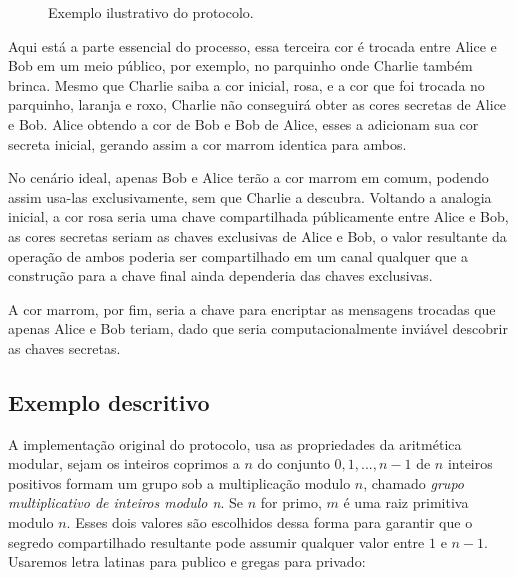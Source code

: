 \documentclass{article}
\begin{document}
\begin{figure}[htpb]
    \centering
    
    \caption{Exemplo ilustrativo do protocolo.}%
    \label{fig:diagram}
\end{figure}

Aqui está a parte essencial do processo, essa terceira cor é trocada entre
Alice e Bob em um meio público, por exemplo, no parquinho onde Charlie também
brinca. Mesmo que Charlie saiba a cor inicial, rosa, e a cor que foi trocada no
parquinho, laranja e roxo, Charlie não conseguirá obter as cores secretas de
Alice e Bob. Alice obtendo a cor de Bob e Bob de Alice, esses a adicionam sua
cor secreta inicial, gerando assim a cor marrom identica para ambos.

No cenário ideal, apenas Bob e Alice terão a cor marrom em comum, podendo assim
usa-las exclusivamente, sem que Charlie a descubra. Voltando a analogia inicial,
a cor rosa seria uma chave compartilhada públicamente entre Alice e Bob, as
cores secretas seriam as chaves exclusivas de Alice e Bob, o valor resultante
da operação de ambos poderia ser compartilhado em um canal qualquer que a
construção para a chave final ainda dependeria das chaves exclusivas.

A cor marrom, por fim, seria a chave para encriptar as mensagens trocadas que
apenas Alice e Bob teriam, dado que seria computacionalmente inviável descobrir
as chaves secretas.


\subsection{Exemplo descritivo}%
\label{sub:exemplo_descritivo}
A implementação original do protocolo\cite{Diffie}, usa as propriedades da
aritmética modular, sejam os inteiros coprimos a $n$ do conjunto
${0, 1, ..., n-1}$ de $n$ inteiros positivos formam um grupo sob a
multiplicação modulo $n$, chamado \textit{grupo multiplicativo de inteiros
modulo n}. Se $n$ for primo, $m$ é uma raiz primitiva modulo $n$. Esses dois
valores são escolhidos dessa forma para garantir que o segredo compartilhado
resultante pode assumir qualquer valor entre $1$ e $n-1$. Usaremos letra
latinas para publico e gregas para privado:
\end{document}
